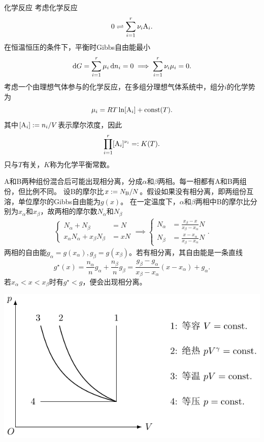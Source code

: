 \begin{example}
	{化学反应}{}
	考虑化学反应
	\[
		0\rightleftharpoons\sum_{i=1}^r\nu_i{\rm A}_i.
	\]
	在恒温恒压的条件下，平衡时Gibbs自由能最小
	\[
		\mathop{}\!\mathrm{d} G=\sum_{i=1}^r\mu_i\mathop{}\!\mathrm{d} n_i=0\implies\sum_{i=1}^r\nu_i\mu_i=0.
	\]
	考虑一个由理想气体参与的化学反应，在多组分理想气体系统中，组分$i$的化学势为
	\[
		\mu_i=RT\ln[{\rm A}_i]+\text{const}(T).
	\]
	其中$[{\rm A}_i]:=n_i/V$表示摩尔浓度，因此
	\begin{equation}
		\prod_{i=1}^r[{\rm A}_i]^{\nu_i}=:K(T).
	\end{equation}
	只与$T$有关，$K$称为化学平衡常数。
\end{example}


A和B两种组份混合后可能出现相分离，分成$\alpha$和$\beta$两相。每一相都有A和B两组份，但比例不同。%
设B的摩尔比$x:=N_{\rm B}/N$。假设如果没有相分离，即两组份互溶，单位摩尔的Gibbs自由能为$g(x)$。
在一定温度下，$\alpha$和$\beta$两相中B的摩尔比分别为$x_\alpha$和$x_\beta$，故两相的摩尔数$N_\alpha$和$N_\beta$%
\begin{align*}
	\left\{
	\begin{aligned}
		N_\alpha+N_\beta                  & =N  \\
		x_\alpha N_\alpha+x_\beta N_\beta & =xN
	\end{aligned}
	\right.\implies
	\left\{
	\begin{aligned}
		N_\alpha & =\frac{x_\beta-x}{x_\beta-x_\alpha}N  \\
		N_\beta  & =\frac{x-x_\alpha}{x_\beta-x_\alpha}N
	\end{aligned}
	\right..
\end{align*}
两相的自由能$g_\alpha=g(x_\alpha),g_\beta=g(x_\beta)$。若有相分离，其自由能是一条直线
\[
	g^\star(x)=\frac{n_\alpha}ng_\alpha+\frac{n_\beta}ng_\beta
	=\frac{g_\beta-g_\alpha}{x_\beta-x_\alpha}(x-x_\alpha)+g_\alpha.
\]
若$x_\alpha<x<x_\beta$时有$g^\star<g$，便会出现相分离。

\begin{center}
	\includegraphics[page=18]{figures/tikz/coordinates.pdf}
	\label{fig:phase separation}
\end{center}

